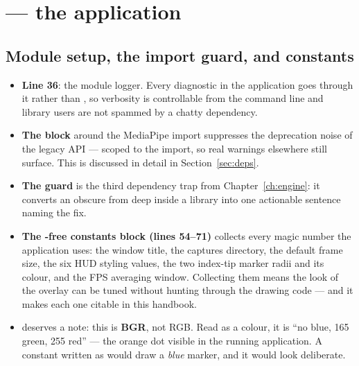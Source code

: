 \section{ --- the application}
\label{sec:src-tracker}

\subsection{Module setup, the import guard, and constants}

\begin{codecard}

\end{codecard}

\begin{itemize}
  \item \textbf{Line 36}: the module logger. Every diagnostic in the application goes through it
        rather than , so verbosity is controllable from the command line and library
        users are not spammed by a chatty dependency.
  \item \textbf{The  block} around the MediaPipe import suppresses
        the deprecation noise of the legacy API --- scoped to the import, so real warnings elsewhere
        still surface. This is discussed in detail in Section~\ref{sec:deps}.
  \item \textbf{The  guard} is the third dependency trap from
        Chapter~\ref{ch:engine}: it converts an obscure  from deep inside a
        library into one actionable sentence naming the fix.
  \item \textbf{The -free constants block (lines 54--71)} collects every magic number the
        application uses: the window title, the captures directory, the default frame size, the six
        HUD styling values, the two index-tip marker radii and its colour, and the FPS averaging
        window. Collecting them means the look of the overlay can be tuned without hunting through
        the drawing code --- and it makes each one citable in this handbook.
  \item {} deserves a note: this is \textbf{BGR}, not RGB.
        Read as a colour, it is ``no blue, 165 green, 255 red'' --- the orange dot visible in the
        running application. A constant written as  would draw a \emph{blue}
        marker, and it would look deliberate.
\end{itemize}

